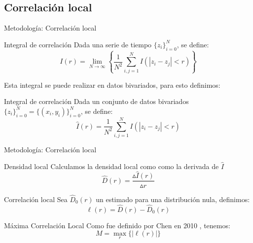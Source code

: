 \documentclass{beamer}
\begin{document}
\subsection{Correlaci\'on local}

\begin{frame}{Metodología: Correlaci\'on local}
    \pause
    \begin{block}{Integral de correlación}
        Dada una serie de tiempo $\{z_i\}_{i=0}^{N}$, se define:
        \begin{equation}\label{información mutua}
            I(r)=\lim _{N \rightarrow \infty}\left\{\frac{1}{N^{2}} \sum_{i, j=1}^{N} I\left(\left|z_{i}-z_{j}\right|<r\right)\right\}
		\end{equation}
    \end{block}
    \pause
	Esta integral se puede realizar en datos bivariados, para esto definimos:
    \pause
    \begin{block}{Integral de correlación}
        Dada un conjunto de datos bivariados $\{z_i\}_{i=0}^{N}=\{(x_i,y_i)\}_{i=0}^{N}$, se define:
        \begin{equation}\label{información mutua}
            \hat{I}(r)=\frac{1}{N^{2}} \sum_{i, j=1}^{N} I\left(\left|z_{i}-z_{j}\right|<r\right)
		\end{equation}
    \end{block}
    \end{frame}

    \begin{frame}{Metodología: Correlaci\'on local}
    \begin{block}{Densidad local}
        Calculamos la densidad local como como la derivada de $\hat{I}$
        \begin{equation}
	    	\hat{D}(r)= \frac{\vartriangle\hat{I}(r)}{\vartriangle r}
        \end{equation}
    \end{block}
    \pause
    
   
    
    \begin{block}{Correlación local}
        Sea $\hat{D}_0(r)$ un estimado para una distribución nula, definimos:
        \begin{equation}\label{MIC}
	    	\ell(r)=\widehat{D}(r)-\widehat{D}_{0}(r)
        \end{equation}
    \end{block}
    \pause
    
    \begin{block}{Máxima Correlación Local }
        Como fue definido por  Chen en 2010 \cite{chen2010}, tenemos:
        \begin{equation}\label{MIC}
	    	M=\max _{r}\{|\ell(r)|\}
        \end{equation}
    \end{block}
\end{frame}
\end{document}

